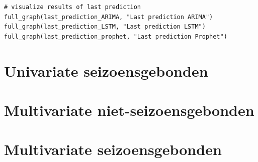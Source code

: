 \begin{verbatim}
# visualize results of last prediction
full_graph(last_prediction_ARIMA, "Last prediction ARIMA")
full_graph(last_prediction_LSTM, "Last prediction LSTM")
full_graph(last_prediction_prophet, "Last prediction Prophet")
\end{verbatim}

\clearpage

\section{Univariate seizoensgebonden}

\section{Multivariate niet-seizoensgebonden}

\section{Multivariate seizoensgebonden}
